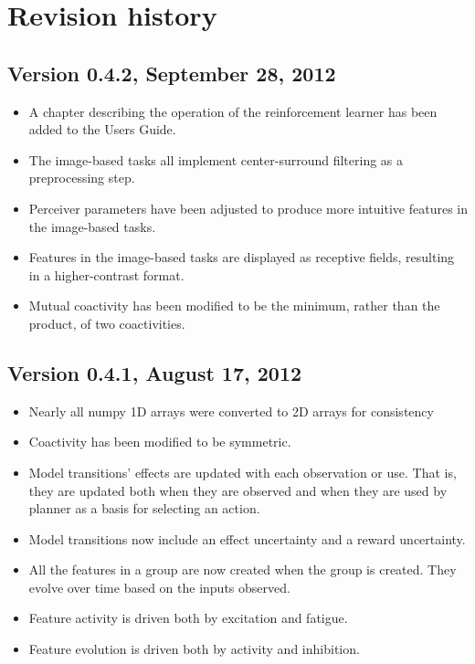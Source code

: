 \chapter{Revision history}

\section*{Version 0.4.2, September 28, 2012}

\begin{itemize}
\item A chapter describing the operation of the reinforcement learner has been added to the Users Guide.
\item The image-based tasks all implement center-surround filtering as a preprocessing step.
\item Perceiver parameters have been adjusted to produce more intuitive features in the image-based tasks.
\item Features in the image-based tasks are displayed as receptive fields, resulting in a higher-contrast format.
\item Mutual coactivity has been modified to be the minimum, rather than the product, of two coactivities.
\end{itemize}


\section*{Version 0.4.1, August 17, 2012}

\begin{itemize}
\item Nearly all numpy 1D arrays were converted to 2D arrays for consistency   
\item Coactivity has been modified to be symmetric.
\item Model transitions' effects are updated with each observation or use. That is, they are updated both when they are observed and when they are used by planner as a basis for selecting an action.
\item Model transitions now include an effect uncertainty and a reward uncertainty. 
\item All the features in a group are now created when the group is created. They evolve over time based on the inputs observed.
\item Feature activity is driven both by excitation and fatigue.
\item Feature evolution is driven both by activity and inhibition.
\end{itemize}


